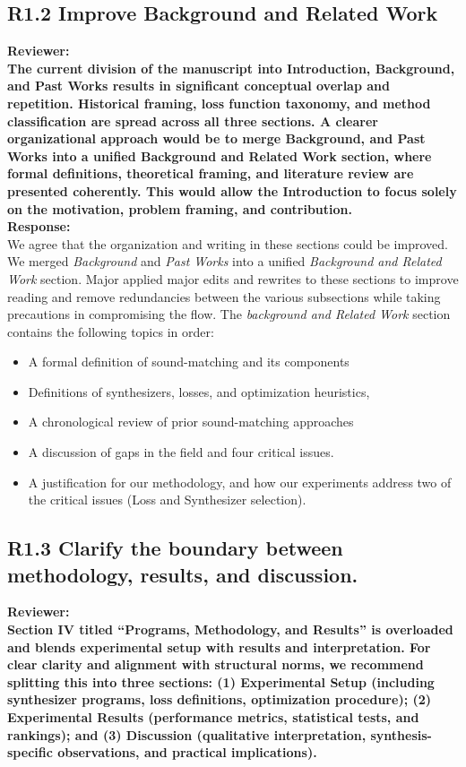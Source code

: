 \documentclass[11pt]{article}
\begin{document}
\subsection{R1.2 Improve Background and Related Work}
\label{R1.2}
\noindent\textbf{Reviewer:}\\
\noindent\textbf{The current division of the manuscript into Introduction, Background, and Past Works results in significant conceptual overlap and repetition. Historical framing, loss function taxonomy, and method classification are spread across all three sections. A clearer organizational approach would be to merge Background, and Past Works into a unified Background and Related Work section, where formal definitions, theoretical framing, and literature review are presented coherently. This would allow the Introduction to focus solely on the motivation, problem framing, and contribution.}\\

\noindent\textbf{Response:} \\
We agree that the organization and writing in these sections could be improved. We merged \emph{Background} and \emph{Past Works} into a unified \emph{Background and Related Work} section. Major applied major edits and rewrites to these sections to improve reading and remove redundancies between the various subsections while taking precautions in compromising the flow.
The \emph{background and Related Work} section contains the following topics in order:  
\begin{itemize}
  \item A formal definition of sound-matching and its components
  \item Definitions of synthesizers, losses, and optimization heuristics,  
  \item A chronological review of prior sound-matching approaches
  \item A discussion of gaps in the field and four critical issues.
  \item A justification for our methodology, and how our experiments address two of the critical issues (Loss and Synthesizer selection).
\end{itemize}


\subsection*{R1.3 Clarify the boundary between methodology, results, and discussion.}
\label{R1.3}
\noindent\textbf{Reviewer:}\\
\textbf{Section IV titled ``Programs, Methodology, and Results'' is overloaded and blends experimental setup with results and interpretation. For clear clarity and alignment with structural norms, we recommend splitting this into three sections: (1) Experimental Setup (including synthesizer programs, loss definitions, optimization procedure); (2) Experimental Results (performance metrics, statistical tests, and rankings); and (3) Discussion (qualitative interpretation, synthesis-specific observations, and practical implications).}
\\
\end{document}
